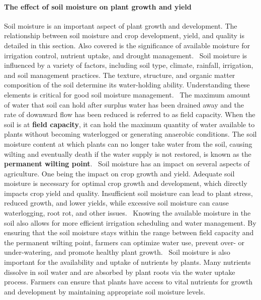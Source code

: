 \documentclass[11pt]{scrartcl} %
\begin{document}
\paragraph{The effect of soil moisture on plant growth and yield}
Soil moisture is an important aspect of plant growth and development. The relationship between soil moisture and crop development, yield, and quality is detailed in this section. Also covered is the significance of available moisture for irrigation control, nutrient uptake, and drought management.~\parencite{soil_moisture_plant_water}
\newline Soil moisture is influenced by a variety of factors, including soil type, climate, rainfall, irrigation, and soil management practices. The texture, structure, and organic matter composition of the soil determine its water-holding ability. Understanding these elements is critical for good soil moisture management.~\parencite{soil_moisture_plant_water}
\newline The maximum amount of water that soil can hold after surplus water has been drained away and the rate of downward flow has been reduced is referred to as field capacity. When the soil is at \textbf{field capacity}, it can hold the maximum quantity of water available to plants without becoming waterlogged or generating anaerobic conditions. The soil moisture content at which plants can no longer take water from the soil, causing wilting and eventually death if the water supply is not restored, is known as the \textbf{permanent wilting point}.~\parencite{soil_moisture_plant_water}
\newline Soil moisture has an impact on several aspects of agriculture. One being the impact on crop growth and yield. Adequate soil moisture is necessary for optimal crop growth and development, which directly impacts crop yield and quality. Insufficient soil moisture can lead to plant stress, reduced growth, and lower yields, while excessive soil moisture can cause waterlogging, root rot, and other issues.~\parencite{soil_moisture_plant_water}
\newline Knowing the available moisture in the soil also allows for more efficient irrigation scheduling and water management. By ensuring that the soil moisture stays within the range between field capacity and the permanent wilting point, farmers can optimize water use, prevent over- or under-watering, and promote healthy plant growth.~\parencite{soil_moisture_plant_water}
\newline Soil moisture is also important for the availability and uptake of nutrients by plants. Many nutrients dissolve in soil water and are absorbed by plant roots via the water uptake process. Farmers can ensure that plants have access to vital nutrients for growth and development by maintaining appropriate soil moisture levels.~\parencite{soil_moisture_plant_water}
\end{document}
